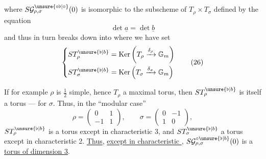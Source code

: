 
where $S\mathcal{G}_{\rho,\sigma}^{\unsure{\circ\flat|\circ}}(0)$ is isomorphic to the subscheme of
$T_\rho\times T_\sigma$ defined by the equation
\[
\det\underline{a}=\det\underline{b}
\tag{24}
\]
and thus in turn breaks down into
where we have set
\[
\left\{
\begin{aligned}
ST_\rho^{\unsure{\flat|b}}&=\operatorname{Ker}\left(T_\rho\xrightarrow{\delta_\rho}\mathbb{G}_m\right)\\
ST_\sigma^{\unsure{\flat|b}}&=\operatorname{Ker}\left(T_\sigma\xrightarrow{\delta_\sigma}\mathbb{G}_m\right)
\end{aligned}
\right.
\tag{26}
\]

If for example $\rho$  is $\frac12$ simple, hence $T_\rho$ a
maximal torus, then $ST_\rho^{\unsure{\flat|b}}$ is itself a torus  ---
 for $\sigma$. Thus,  in the ``modular case''
\[
\rho=\begin{pmatrix}0&1\\-1&1\end{pmatrix},\qquad
\sigma=\begin{pmatrix}0&-1\\1&0\end{pmatrix},
\]
$ST_\rho^{\unsure{\flat|b}}$ is a
torus  except in characteristic 3, and $ST_\sigma^{\unsure{\flat|b}}$ a torus except in
characteristic 2. \uline{Thus}, \uline{except in characteristic }, $S\mathcal{G}_{\rho,\sigma}^{\circ\unsure{\flat|b}}(0)$ is a
\uline{torus of dimension 3}.

